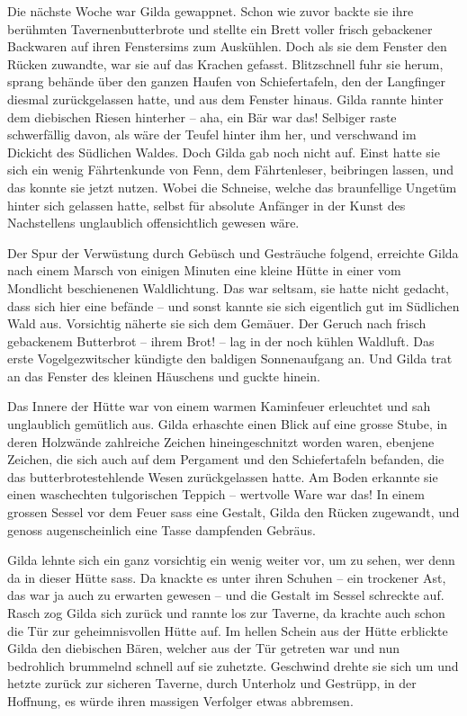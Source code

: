 Die nächste Woche war Gilda gewappnet. Schon wie zuvor backte sie ihre berühmten Tavernenbutterbrote und stellte ein Brett voller frisch gebackener Backwaren auf ihren Fenstersims zum Auskühlen. Doch als sie dem Fenster den Rücken zuwandte, war sie auf das Krachen gefasst. Blitzschnell fuhr sie herum, sprang behände über den ganzen Haufen von Schiefertafeln, den der Langfinger diesmal zurückgelassen hatte, und aus dem Fenster hinaus. Gilda rannte hinter dem diebischen Riesen hinterher – aha, ein Bär war das! Selbiger raste schwerfällig davon, als wäre der Teufel hinter ihm her, und verschwand im Dickicht des Südlichen Waldes. Doch Gilda gab noch nicht auf. Einst hatte sie sich ein wenig Fährtenkunde von Fenn, dem Fährtenleser, beibringen lassen, und das konnte sie jetzt nutzen. Wobei die Schneise, welche das braunfellige Ungetüm hinter sich gelassen hatte, selbst für absolute Anfänger in der Kunst des Nachstellens unglaublich offensichtlich gewesen wäre.

Der Spur der Verwüstung durch Gebüsch und Gesträuche folgend, erreichte Gilda nach einem Marsch von einigen Minuten eine kleine Hütte in einer vom Mondlicht beschienenen Waldlichtung. Das war seltsam, sie hatte nicht gedacht, dass sich hier eine befände – und sonst kannte sie sich eigentlich gut im Südlichen Wald aus. Vorsichtig näherte sie sich dem Gemäuer. Der Geruch nach frisch gebackenem Butterbrot – ihrem Brot! – lag in der noch kühlen Waldluft. Das erste Vogelgezwitscher kündigte den baldigen Sonnenaufgang an. Und Gilda trat an das Fenster des kleinen Häuschens und guckte hinein.

Das Innere der Hütte war von einem warmen Kaminfeuer erleuchtet und sah unglaublich gemütlich aus. Gilda erhaschte einen Blick auf eine grosse Stube, in deren Holzwände zahlreiche Zeichen hineingeschnitzt worden waren, ebenjene Zeichen, die sich auch auf dem Pergament und den Schiefertafeln befanden, die das butterbrotestehlende Wesen zurückgelassen hatte. Am Boden erkannte sie einen waschechten tulgorischen Teppich – wertvolle Ware war das! In einem grossen Sessel vor dem Feuer sass eine Gestalt, Gilda den Rücken zugewandt, und genoss augenscheinlich eine Tasse dampfenden Gebräus.

Gilda lehnte sich ein ganz vorsichtig ein wenig weiter vor, um zu sehen, wer denn da in dieser Hütte sass. Da knackte es unter ihren Schuhen – ein trockener Ast, das war ja auch zu erwarten gewesen – und die Gestalt im Sessel schreckte auf. Rasch zog Gilda sich zurück und rannte los zur Taverne, da krachte auch schon die Tür zur geheimnisvollen Hütte auf. Im hellen Schein aus der Hütte erblickte Gilda den diebischen Bären, welcher aus der Tür getreten war und nun bedrohlich brummelnd schnell auf sie zuhetzte. Geschwind drehte sie sich um und hetzte zurück zur sicheren Taverne, durch Unterholz und Gestrüpp, in der Hoffnung, es würde ihren massigen Verfolger etwas abbremsen.

